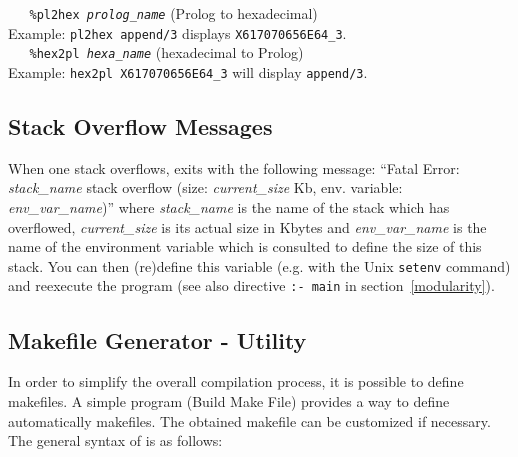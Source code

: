 {\tt ~~~\%pl2hex {\em prolog\_name}} (Prolog to hexadecimal)\\

Example: {\tt pl2hex append/3} displays {\tt X617070656E64\_3}.\\

{\tt ~~~\%hex2pl {\em hexa\_name}} (hexadecimal to Prolog)\\

Example: {\tt hex2pl X617070656E64\_3} will display {\tt append/3}.



\subsection{Stack Overflow Messages}
\label{stack-overflow}

When one stack overflows, {\wamcc} exits with the following message:
``Fatal Error: {\em stack\_name} stack overflow (size:{\em
current\_size} Kb, env. variable: {\em env\_var\_name})'' where {\em
stack\_name} is the name of the stack which has overflowed, {\em
current\_size} is its actual size in Kbytes and {\em env\_var\_name}
is the name of the environment variable which is consulted to define
the size of this stack. You can then (re)define this variable 
(e.g. with the Unix {\tt setenv} command) and reexecute the program 
(see also directive {\tt :- main} in section~\ref{modularity}).




\subsection{Makefile Generator - {\bmf} Utility}

In order to simplify the overall compilation process, it is possible
to define makefiles. A simple program {\bmf} (Build Make File)
provides a way to define automatically makefiles. 
The obtained makefile can be customized if necessary.
The  general syntax of {\bmf} is as follows:\\

